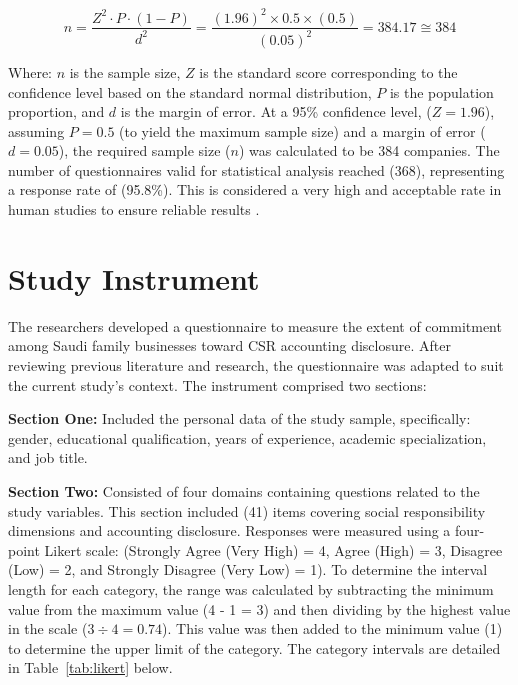 \documentclass[10pt]{NSP1}
\begin{document}
	\begin{equation}
		n = \frac{Z^{2} \cdot P \cdot (1 - P)}{d^{2}}
		= \frac{(1.96)^{2} \times 0.5 \times (0.5)}{(0.05)^{2}}
		= 384.17 \cong 384
	\end{equation}
	
	Where: \(n\) is the sample size, \(Z\) is the standard score corresponding to the confidence level based on the standard normal distribution, \(P\) is the population proportion, and \(d\) is the margin of error. At a 95\% confidence level, (\(Z = 1.96\)), assuming \(P = 0.5\) (to yield the maximum sample size) and a margin of error (\(d = 0.05\)), the required sample size (\(n\)) was calculated to be 384 companies. The number of questionnaires valid for statistical analysis reached (368), representing a response rate of (95.8\%). This is considered a very high and acceptable rate in human studies to ensure reliable results \cite{Babbie2020}.
	
	\section{Study Instrument}
	
	The researchers developed a questionnaire to measure the extent of commitment among Saudi family businesses toward CSR accounting disclosure. After reviewing previous literature and research, the questionnaire was adapted to suit the current study's context. The instrument comprised two sections:
	
	\textbf{Section One:} Included the personal data of the study sample, specifically: gender, educational qualification, years of experience, academic specialization, and job title.
	
	\textbf{Section Two:} Consisted of four domains containing questions related to the study variables. This section included (41) items covering social responsibility dimensions and accounting disclosure. Responses were measured using a four-point Likert scale: (Strongly Agree (Very High) = 4, Agree (High) = 3, Disagree (Low) = 2, and Strongly Disagree (Very Low) = 1). To determine the interval length for each category, the range was calculated by subtracting the minimum value from the maximum value (4 - 1 = 3) and then dividing by the highest value in the scale (\(3 \div 4 = 0.74\)). This value was then added to the minimum value (1) to determine the upper limit of the category. The category intervals are detailed in Table~\ref{tab:likert} below.
	
\end{document}
